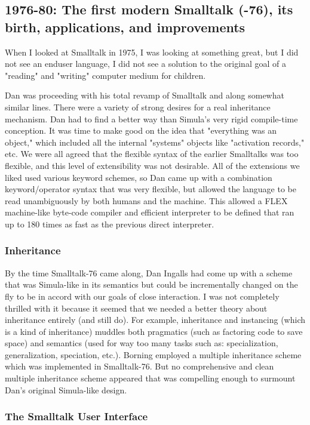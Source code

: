 \documentclass[letterpaper,12pt,parskip=full]{article}
\begin{document}
\subsection{1976-80: The first modern Smalltalk (-76), its birth, applications, and improvements}

When I looked at Smalltalk in 1975, I was looking at something great, but I did not see an enduser language, I did not see a solution to the original goal of a "reading" and "writing" computer medium for children.

Dan was proceeding with his total revamp of Smalltalk and along somewhat similar lines. There were a variety of strong desires for a real inheritance mechanism. Dan had to find a better way than Simula's very rigid compile-time conception. It was time to make good on the idea that "everything was an object," which included all the internal "systems" objects like "activation records," etc. We were all agreed that the flexible syntax of the earlier Smalltalks was too flexible, and this level of extensibility was not desirable. All of the extensions we liked used various keyword schemes, so Dan came up with a combination keyword/operator syntax that was very flexible, but allowed the language to be read unambiguously by both humans and the machine. This allowed a FLEX machine-like byte-code compiler and efficient interpreter to be defined that ran up to 180 times as fast as the previous direct interpreter. 

\subsubsection{Inheritance}

By the time Smalltalk-76 came along, Dan Ingalls had come up with a scheme that was Simula-like in its semantics but could be incrementally changed on the fly to be in accord with our goals of close interaction. I was not completely thrilled with it because it seemed that we needed a better theory about inheritance entirely (and still do). For example, inheritance and instancing (which is a kind of inheritance) muddles both pragmatics (such as factoring code to save space) and semantics (used for way too many tasks such as: specialization, generalization, speciation, etc.). Borning employed a multiple inheritance scheme which was implemented in Smalltalk-76. But no comprehensive and clean multiple inheritance scheme appeared that was compelling enough to surmount Dan's original Simula-like design. 
 
 \subsubsection{The Smalltalk User Interface}
 
\end{document}
